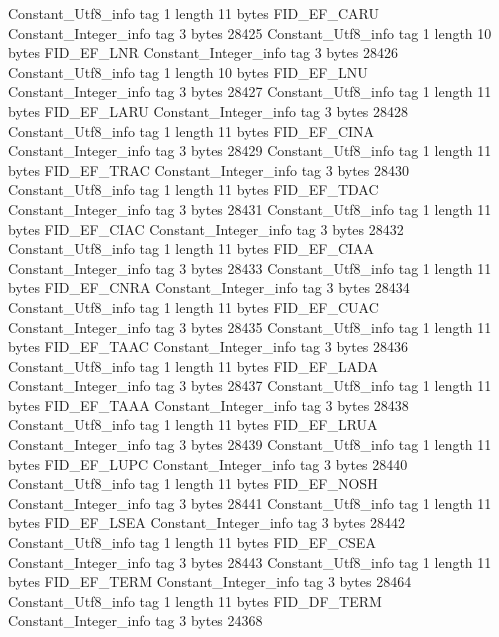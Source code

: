 {{{		}
		Constant_Utf8_info {
			tag	1
			length	11
			bytes	FID_EF_CARU
		}
		Constant_Integer_info {
			tag	3
			bytes	28425
		}
		Constant_Utf8_info {
			tag	1
			length	10
			bytes	FID_EF_LNR
		}
		Constant_Integer_info {
			tag	3
			bytes	28426
		}
		Constant_Utf8_info {
			tag	1
			length	10
			bytes	FID_EF_LNU
		}
		Constant_Integer_info {
			tag	3
			bytes	28427
		}
		Constant_Utf8_info {
			tag	1
			length	11
			bytes	FID_EF_LARU
		}
		Constant_Integer_info {
			tag	3
			bytes	28428
		}
		Constant_Utf8_info {
			tag	1
			length	11
			bytes	FID_EF_CINA
		}
		Constant_Integer_info {
			tag	3
			bytes	28429
		}
		Constant_Utf8_info {
			tag	1
			length	11
			bytes	FID_EF_TRAC
		}
		Constant_Integer_info {
			tag	3
			bytes	28430
		}
		Constant_Utf8_info {
			tag	1
			length	11
			bytes	FID_EF_TDAC
		}
		Constant_Integer_info {
			tag	3
			bytes	28431
		}
		Constant_Utf8_info {
			tag	1
			length	11
			bytes	FID_EF_CIAC
		}
		Constant_Integer_info {
			tag	3
			bytes	28432
		}
		Constant_Utf8_info {
			tag	1
			length	11
			bytes	FID_EF_CIAA
		}
		Constant_Integer_info {
			tag	3
			bytes	28433
		}
		Constant_Utf8_info {
			tag	1
			length	11
			bytes	FID_EF_CNRA
		}
		Constant_Integer_info {
			tag	3
			bytes	28434
		}
		Constant_Utf8_info {
			tag	1
			length	11
			bytes	FID_EF_CUAC
		}
		Constant_Integer_info {
			tag	3
			bytes	28435
		}
		Constant_Utf8_info {
			tag	1
			length	11
			bytes	FID_EF_TAAC
		}
		Constant_Integer_info {
			tag	3
			bytes	28436
		}
		Constant_Utf8_info {
			tag	1
			length	11
			bytes	FID_EF_LADA
		}
		Constant_Integer_info {
			tag	3
			bytes	28437
		}
		Constant_Utf8_info {
			tag	1
			length	11
			bytes	FID_EF_TAAA
		}
		Constant_Integer_info {
			tag	3
			bytes	28438
		}
		Constant_Utf8_info {
			tag	1
			length	11
			bytes	FID_EF_LRUA
		}
		Constant_Integer_info {
			tag	3
			bytes	28439
		}
		Constant_Utf8_info {
			tag	1
			length	11
			bytes	FID_EF_LUPC
		}
		Constant_Integer_info {
			tag	3
			bytes	28440
		}
		Constant_Utf8_info {
			tag	1
			length	11
			bytes	FID_EF_NOSH
		}
		Constant_Integer_info {
			tag	3
			bytes	28441
		}
		Constant_Utf8_info {
			tag	1
			length	11
			bytes	FID_EF_LSEA
		}
		Constant_Integer_info {
			tag	3
			bytes	28442
		}
		Constant_Utf8_info {
			tag	1
			length	11
			bytes	FID_EF_CSEA
		}
		Constant_Integer_info {
			tag	3
			bytes	28443
		}
		Constant_Utf8_info {
			tag	1
			length	11
			bytes	FID_EF_TERM
		}
		Constant_Integer_info {
			tag	3
			bytes	28464
		}
		Constant_Utf8_info {
			tag	1
			length	11
			bytes	FID_DF_TERM
		}
		Constant_Integer_info {
			tag	3
			bytes	24368
}}}
